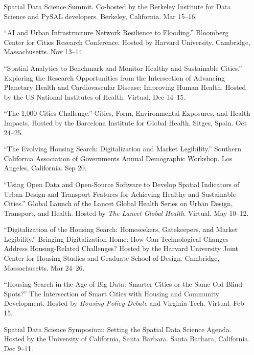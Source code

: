 \documentclass[11pt,a4paper]{report} %
\begin{document}
\begin{tablist}

\item[2026] \tab{}Spatial Data Science Summit. Co-hosted by the Berkeley Institute for Data Science and PySAL developers. Berkeley, California. Mar 15--16.

\item[2025] \tab{}\enquote{AI and Urban Infrastructure Network Resilience to Flooding.} Bloomberg Center for Cities Research Conference. Hosted by Harvard University. Cambridge, Massachusetts. Nov 13--14.

\item[2023] \tab{}\enquote{Spatial Analytics to Benchmark and Monitor Healthy and Sustainable Cities.} Exploring the Research Opportunities from the Intersection of Advancing Planetary Health and Cardiovascular Disease: Improving Human Health. Hosted by the US National Institutes of Health. Virtual. Dec 14--15.

\item[2023] \tab{}\enquote{The 1,000 Cities Challenge.} Cities, Form, Environmental Exposures, and Health Impacts. Hosted by the Barcelona Institute for Global Health. Sitges, Spain. Oct 24--25.

\item[2023] \tab{}\enquote{The Evolving Housing Search: Digitalization and Market Legibility.} Southern California Association of Governments Annual Demographic Workshop. Los Angeles, California. Sep 20.

\item[2022] \tab{}\enquote{Using Open Data and Open-Source Software to Develop Spatial Indicators of Urban Design and Transport Features for Achieving Healthy and Sustainable Cities.} Global Launch of the Lancet Global Health Series on Urban Design, Transport, and Health. Hosted by \textit{The Lancet Global Health}. Virtual. May 10--12.

\item[2022] \tab{}\enquote{Digitalization of the Housing Search: Homeseekers, Gatekeepers, and Market Legibility.} Bringing Digitalization Home: How Can Technological Changes Address Housing-Related Challenges? Hosted by the Harvard University Joint Center for Housing Studies and Graduate School of Design. Cambridge, Massachusetts. Mar 24--26.

\item[2021] \tab{}\enquote{Housing Search in the Age of Big Data: Smarter Cities or the Same Old Blind Spots?} The Intersection of Smart Cities with Housing and Community Development. Hosted by \textit{Housing Policy Debate} and Virginia Tech. Virtual. Feb 15.

\item[2019] \tab{}Spatial Data Science Symposium: Setting the Spatial Data Science Agenda. Hosted by the University of California, Santa Barbara. Santa Barbara, California. Dec 9--11.

\end{tablist}
\end{document}
